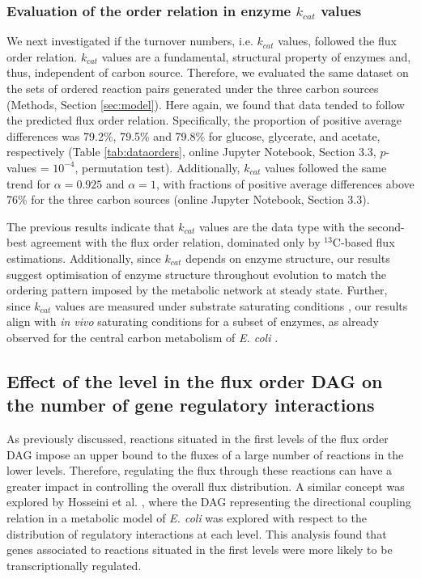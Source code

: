 \documentclass[12pt]{article}
\begin{document}
\subsubsection{Evaluation of the order relation in enzyme $k_{cat}$ values}
We next investigated if the turnover numbers, i.e. $k_{cat}$ values, followed the flux order relation. $k_{cat}$ values are a fundamental, structural property of enzymes and, thus, independent of carbon source. Therefore, we evaluated the same dataset on the sets of ordered reaction pairs generated under the three carbon sources (Methods, Section \ref{sec:model}). Here again, we found that data tended to follow the predicted flux order relation. Specifically, the proportion of positive average differences was 79.2\%, 79.5\% and 79.8\% for glucose, glycerate, and acetate, respectively (Table \ref{tab:dataorders}, online Jupyter Notebook, Section 3.3, $p$-values = $10^{-4}$, permutation test). Additionally, $k_{cat}$ values followed the same trend for $\alpha=0.925$ and $\alpha=1$, with fractions of positive average differences above 76\% for the three carbon sources (online Jupyter Notebook, Section 3.3).

The previous results indicate that $k_{cat}$ values are the data type with the second-best agreement with the flux order relation, dominated only by ${}^{13}\mathrm{C}$-based flux estimations.  Additionally, since $k_{cat}$ depends on enzyme structure, our results suggest optimisation of enzyme structure throughout evolution to match the ordering pattern imposed by the metabolic network at steady state. Further, since $k_{cat}$ values are measured under substrate saturating conditions \cite{Davidi2016}, our results align with \emph{in vivo} saturating conditions for a subset of enzymes, as already observed for the central carbon metabolism of \emph{E. coli} \cite{Bennett2009a}.

\subsection{Effect of the level in the flux order DAG on the number of gene regulatory interactions}
As previously discussed, reactions situated in the first levels of the flux order DAG impose an upper bound to the fluxes of a large number of reactions in the lower levels. Therefore, regulating the flux through these reactions can have a greater impact in controlling the overall flux distribution. A similar concept was explored by Hosseini et al. \cite{Hosseini2015}, where the DAG representing the directional coupling relation in a metabolic model of \emph{E. coli} was explored with respect to the distribution of regulatory interactions at each level. This analysis found that genes associated to reactions situated in the first levels were more likely to be transcriptionally regulated.
\end{document}
